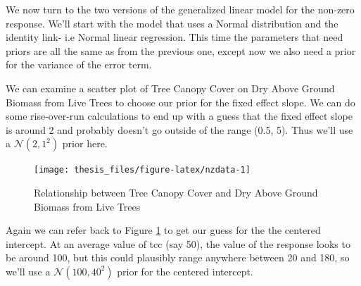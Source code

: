 \documentclass[12pt,twoside]{reedthesis}
\begin{document}
We now turn to the two versions of the generalized linear model for the non-zero response. We'll start with the model that uses a Normal distribution and the identity link- i.e Normal linear regression. This time the parameters that need priors are all the same as from the previous one, except now we also need a prior for the variance of the error term.

We can examine a scatter plot of Tree Canopy Cover on Dry Above Ground Biomass from Live Trees to choose our prior for the fixed effect slope. We can do some rise-over-run calculations to end up with a guess that the fixed effect slope is around 2 and probably doesn't go outside of the range (0.5, 5). Thus we'll use a \(\mathcal{N}(2, 1^2)\) prior here.
\begin{figure}

{\centering \texttt{[image: thesis\_files/figure-latex/nzdata-1]} 

}

\caption{Relationship between Tree Canopy Cover and Dry Above Ground Biomass from Live Trees}\label{fig:nzdata}
\end{figure}
Again we can refer back to Figure \ref{fig:nzdata} to get our guess for the the centered intercept. At an average value of tcc (say 50), the value of the response looks to be around 100, but this could plausibly range anywhere between 20 and 180, so we'll use a \(\mathcal{N}(100, 40^2)\) prior for the centered intercept.
\end{document}
